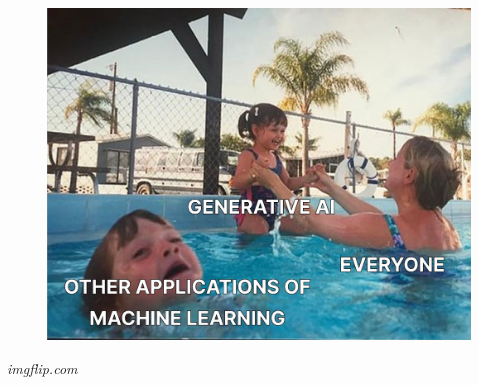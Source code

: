 \begin{frame}[t,fragile]
{\begin{minipage}[b]{\textwidth}
\begin{minipage}[b]{0.33\textwidth}
\begin{figure}[ht]
                \includegraphics[width=\textwidth]{img/meme-3-cut.jpeg}
            \end{figure}
            \begin{flushright}
                \vspace*{-7pt}
                {\tiny\textit{\textcopyright imgflip.com}}
            \end{flushright}
        \end{minipage}
        \begin{minipage}[b]{0.33\textwidth}
            \centering
            \begin{figure}[ht]

\end{figure}
\end{minipage}
\end{minipage}}
\end{frame}
